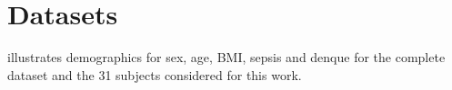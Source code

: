 \documentclass[mlabstract,twocolumn]{jmlr}
\begin{document}



\appendix

\section{Datasets}\label{apd:datasets}
 illustrates demographics for sex, age, BMI, sepsis and denque for the complete dataset and the 31 subjects considered for this work.
\end{document}
